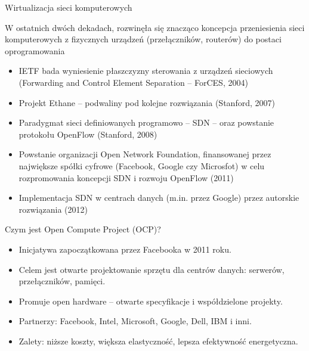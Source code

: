 \documentclass[aspectratio=169]{beamer}
\begin{document}
\begin{frame}{Wirtualizacja sieci komputerowych}

W ostatnich dwóch dekadach, rozwinęła się znacząco koncepcja przeniesienia sieci komputerowych z fizycznych urządzeń (przełączników, routerów) do postaci oprogramowania
\begin{itemize}
    \item IETF bada wyniesienie płaszczyzny sterowania z urządzeń sieciowych (Forwarding and Control Element Separation -- ForCES, 2004)
    \item Projekt Ethane -- podwaliny pod kolejne rozwiązania (Stanford, 2007)
    \item Paradygmat sieci definiowanych programowo -- SDN -- oraz powstanie protokołu OpenFlow (Stanford, 2008)
    \item Powstanie organizacji Open Network Foundation, finansowanej przez największe spółki cyfrowe (Facebook, Google czy Microsfot) w celu rozpromowania koncepcji SDN i rozwoju OpenFlow (2011)
    \item Implementacja SDN w centrach danych (m.in. przez Google) przez autorskie rozwiązania (2012)
    
\end{itemize}
\end{frame}

\begin{frame}{Czym jest Open Compute Project (OCP)?}
\begin{itemize}
    \item Inicjatywa zapoczątkowana przez Facebooka w 2011 roku.
    \item Celem jest otwarte projektowanie sprzętu dla centrów danych: serwerów, przełączników, pamięci.
    \item Promuje open hardware – otwarte specyfikacje i współdzielone projekty.
    \item Partnerzy: Facebook, Intel, Microsoft, Google, Dell, IBM i inni.
    \item Zalety: niższe koszty, większa elastyczność, lepsza efektywność energetyczna.
\end{itemize}
\end{frame}
\end{document}
